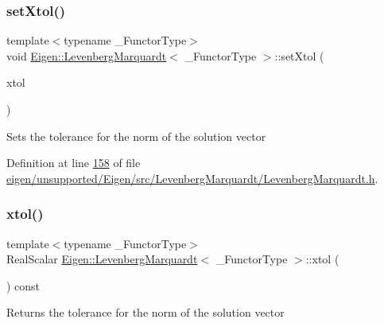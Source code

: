 \subsubsection{\texorpdfstring{set\+Xtol()}{setXtol()}\hspace{0.1cm}{\footnotesize\ttfamily [2/2]}}
{\footnotesize\ttfamily template$<$typename \+\_\+\+Functor\+Type$>$ \\
void \hyperlink{class_eigen_1_1_levenberg_marquardt}{Eigen\+::\+Levenberg\+Marquardt}$<$ \+\_\+\+Functor\+Type $>$\+::set\+Xtol (\begin{DoxyParamCaption}\item[{Real\+Scalar}]{xtol }\end{DoxyParamCaption})\hspace{0.3cm}{\ttfamily [inline]}}

Sets the tolerance for the norm of the solution vector 

Definition at line \hyperlink{eigen_2unsupported_2_eigen_2src_2_levenberg_marquardt_2_levenberg_marquardt_8h_source_l00158}{158} of file \hyperlink{eigen_2unsupported_2_eigen_2src_2_levenberg_marquardt_2_levenberg_marquardt_8h_source}{eigen/unsupported/\+Eigen/src/\+Levenberg\+Marquardt/\+Levenberg\+Marquardt.\+h}.

\mbox{\label{class_eigen_1_1_levenberg_marquardt_a25a7629ea877d8f08670536b3d234897}} 
\subsubsection{\texorpdfstring{xtol()}{xtol()}\hspace{0.1cm}{\footnotesize\ttfamily [1/2]}}
{\footnotesize\ttfamily template$<$typename \+\_\+\+Functor\+Type$>$ \\
Real\+Scalar \hyperlink{class_eigen_1_1_levenberg_marquardt}{Eigen\+::\+Levenberg\+Marquardt}$<$ \+\_\+\+Functor\+Type $>$\+::xtol (\begin{DoxyParamCaption}{ }\end{DoxyParamCaption}) const\hspace{0.3cm}{\ttfamily [inline]}}

\begin{DoxyReturn}{Returns}
the tolerance for the norm of the solution vector 
\end{DoxyReturn}


